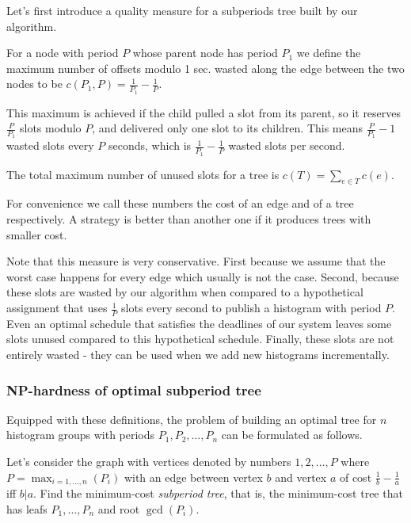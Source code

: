 Let’s first introduce a quality measure for a subperiods tree built by our algorithm. 

\begin{definition}
For a node with period $P$ whose parent node has period $P_1$ we define the maximum number of offsets modulo 1 sec. wasted along the edge between the two nodes to be $c(P_1,P)=\frac{1}{P_1}-\frac 1 P$.
\end{definition}

This maximum is achieved if the child pulled a slot from its parent, so it reserves $\frac P {P_1}$ slots modulo $P$, and delivered only one slot to its children. This means $\frac P {P_1}-1$ wasted slots every $P$ seconds, which is $\frac 1 {P_1}- \frac 1 P$ wasted slots per second. 

\begin{definition}
The total maximum number of unused slots for a tree is $c(T)=\sum_{e\in T}c(e)$. 
\end{definition}

For convenience we call these numbers the cost of an edge and of a tree respectively. A strategy is better than another one if it produces trees with smaller cost. 

Note that this measure is very conservative. First because we assume that the worst case happens for every edge which usually is not the case. Second, because these slots are wasted by our algorithm when compared to a hypothetical assignment that uses $\frac 1 P$ slots every second to publish a histogram with period $P$. Even an optimal schedule that satisfies the deadlines of our system leaves some slots unused compared to this hypothetical schedule. Finally, these slots are not entirely wasted - they can be used when we add new histograms incrementally.

\subsubsection*{NP-hardness of optimal subperiod tree}

Equipped with these definitions, the problem of building an optimal tree for $n$ histogram groups with periods $P_1, P_2, \ldots,P_n$ can be formulated as follows. 

\begin{problem}
Let’s consider the graph with vertices denoted by numbers $1,2,\ldots ,P$ where $P=\max_{i=1,\ldots,n}(P_i)$ with an edge between vertex $b$ and vertex $a$ of cost $\frac 1 b -\frac 1 a$ iff $b \vert a$. Find the minimum-cost \emph{subperiod tree}, that is, the minimum-cost tree that has leafs $P_1,\ldots,P_n$ and root $\gcd(P_i)$.
\end{problem}

